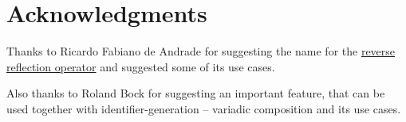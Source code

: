 \section{Acknowledgments}

Thanks to Ricardo Fabiano de Andrade for suggesting the name \verb@unreflexpr@ for
the \hyperref[fut-reverse-reflection]{reverse reflection operator} and
suggested some of its use cases.

Also thanks to Roland Bock for suggesting an important feature, that can be
used together with identifier-generation -- variadic composition and its use cases.

